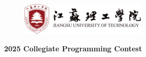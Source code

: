\documentclass{xcpczh}
\begin{document}
	\pagestyle{empty}
	
	\begin{center}
		\vspace*{12em}
		
		\begin{figure}[htbp]
			\centering
			\begin{minipage}[t]{0.48\textwidth}
				\centering
			\end{minipage}
			\begin{minipage}[t]{0.48\textwidth}
				\centering
				\includegraphics[width=6cm]{jsuttext}
			\end{minipage}
		\end{figure}
		
		{\LARGE\bf 2025 \schoolshort Collegiate Programming Contest\\\schoolname\\\vspace*{1em}\location}
	\end{center}
	\tableofcontents
	\clearpage 
	\pagestyle{fancy}
\end{document}
